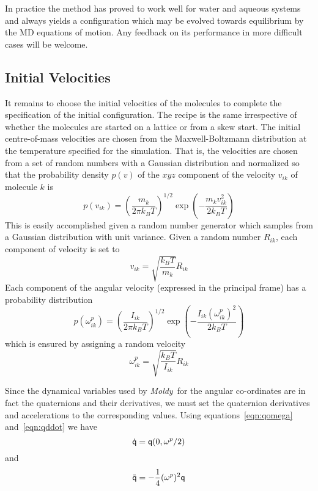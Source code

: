 \documentclass[a4paper,twoside]{report}
\providecommand{\bm}[1]{\mathbf{#1}}
\newcommand{\moldy}{\emph{Moldy}}
\begin{document}
In practice the method has proved to work well for water and aqueous
systems and always yields a configuration which may be evolved towards
equilibrium by the MD equations of motion.  Any feedback on its
performance in more difficult cases will be welcome.

\subsection{Initial Velocities}
\label{sec:velinit}
It remains to choose the initial velocities of the molecules to
complete the specification of the initial configuration.  The recipe
is the same irrespective of whether the molecules are started on a
lattice or from a skew start.  The initial centre-of-mass velocities
are chosen from the Maxwell-Boltzmann distribution at the temperature
specified for the simulation\cite[pp 170]{allen:87}.  That is, the
velocities are chosen from a set of random numbers with a Gaussian
distribution and normalized so that the probability density $p(v)$ of
the $xyz$ component of the velocity $v_{ik}$ of molecule $k$ is
\begin{equation}
p(v_{ik}) = \left ( \frac{m_k}{2 \pi k_B T}\right )^{1/2} 
\exp(-\frac{m_k v_{ik}^2}{2 k_B T})
\end{equation}
This is easily accomplished given a random number generator which
samples from a Gaussian distribution with unit variance.  Given a
random number $R_{ik}$, each component of velocity is set to
\begin{equation}
v_{ik} = \sqrt{\frac{k_B T}{m_k}} R_{ik}
\end{equation}
Each component of the angular velocity (expressed in the
principal frame) has a probability distribution
\begin{equation}
p(\omega^p_{ik}) = \left ( \frac{I_{ik}}{2 \pi k_B T}\right )^{1/2}
\exp(-\frac{I_{ik} (\omega^p_{ik})^2}{2 k_B T})
\end{equation}
which is ensured by assigning a random velocity
\begin{equation}
\label{eqn:omega-rand}
\omega^p_{ik} = \sqrt{\frac{k_B T}{I_{ik}}} R_{ik}
\end{equation}

Since the dynamical variables used by \moldy\ for the angular
co-ordinates are in fact the quaternions and their derivatives, we
must set the quaternion derivatives and accelerations to the corresponding
values. Using equations~\ref{eqn:qomega} and~\ref{eqn:qddot} we
have
\begin{equation}
\Quat{\dot{q}} = \Quat{q}(0,\bm{\omega}^p/2)
\end{equation}
and
\begin{equation}
\Quat{\ddot{q}} = -\frac{1}{4}(\omega^p)^2 \Quat{q}
\end{equation}
\end{document}
